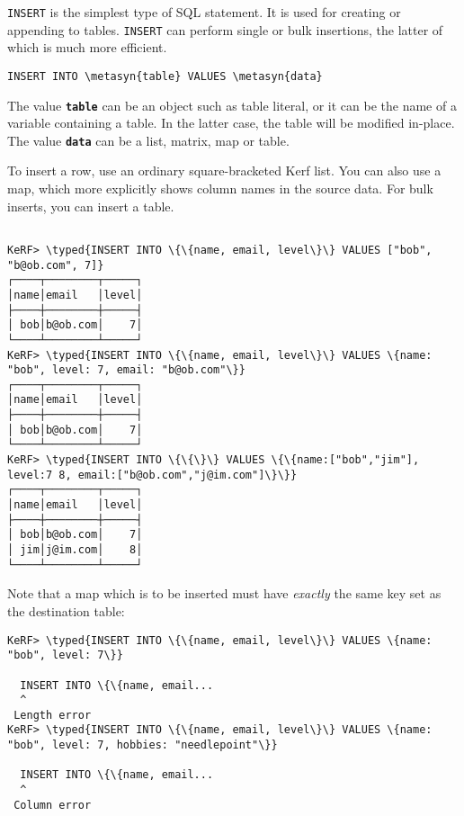 \documentclass{article}
\newcommand{\typed}[1]{\textcolor{TealBlue}{#1}}
\newcommand{\metasyn}[1]{\texttt{\textbf{#1}}}
\begin{document}
\texttt{INSERT} is the simplest type of SQL statement. It is used for creating or appending to tables. \texttt{INSERT} can perform single or bulk insertions, the latter of which is much more efficient.
\begin{Verbatim}
INSERT INTO \metasyn{table} VALUES \metasyn{data}
\end{Verbatim}

The value \metasyn{table} can be an object such as table literal, or it can be the name of a variable containing a table. In the latter case, the table will be modified in-place. The value \metasyn{data} can be a list, matrix, map or table.

\vspace{0.5cm}

%

To insert a row, use an ordinary square-bracketed Kerf list. You can also use a map, which more explicitly shows column names in the source data. For bulk inserts, you can insert a table.

\begin{Verbatim}

KeRF> \typed{INSERT INTO \{\{name, email, level\}\} VALUES ["bob", "b@ob.com", 7]}
┌────┬────────┬─────┐
│name│email   │level│
├────┼────────┼─────┤
│ bob│b@ob.com│    7│
└────┴────────┴─────┘
KeRF> \typed{INSERT INTO \{\{name, email, level\}\} VALUES \{name: "bob", level: 7, email: "b@ob.com"\}}
┌────┬────────┬─────┐
│name│email   │level│
├────┼────────┼─────┤
│ bob│b@ob.com│    7│
└────┴────────┴─────┘
KeRF> \typed{INSERT INTO \{\{\}\} VALUES \{\{name:["bob","jim"], level:7 8, email:["b@ob.com","j@im.com"]\}\}}
┌────┬────────┬─────┐
│name│email   │level│
├────┼────────┼─────┤
│ bob│b@ob.com│    7│
│ jim│j@im.com│    8│
└────┴────────┴─────┘
\end{Verbatim}

\pagebreak

Note that a map which is to be inserted must have \emph{exactly} the same key set as the destination table:
\begin{Verbatim}
KeRF> \typed{INSERT INTO \{\{name, email, level\}\} VALUES \{name: "bob", level: 7\}}

  INSERT INTO \{\{name, email...
  ^
 Length error
KeRF> \typed{INSERT INTO \{\{name, email, level\}\} VALUES \{name: "bob", level: 7, hobbies: "needlepoint"\}}

  INSERT INTO \{\{name, email...
  ^
 Column error

\end{Verbatim}
\end{document}

